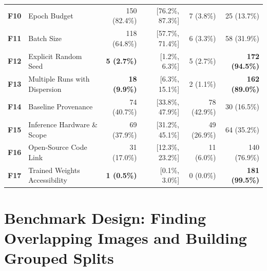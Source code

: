 \documentclass[pdflatex,sn-apa]{sn-jnl}
\begin{document}
\begin{table}[htbp]
\begin{tabularx}{\textwidth}{l >{\raggedright\arraybackslash}X r r r r}
\textbf{F10} & Epoch Budget & 150 (82.4\%) & [76.2\%, 87.3\%] & 7 (3.8\%) & 25 (13.7\%) \\
\textbf{F11} & Batch Size & 118 (64.8\%) & [57.7\%, 71.4\%] & 6 (3.3\%) & 58 (31.9\%) \\
\textbf{F12} & Explicit Random Seed & \textbf{5 (2.7\%)} & [1.2\%, 6.3\%] & 5 (2.7\%) & \textbf{172 (94.5\%)} \\
\textbf{F13} & Multiple Runs with Dispersion & \textbf{18 (9.9\%)} & [6.3\%, 15.1\%] & 2 (1.1\%) & \textbf{162 (89.0\%)} \\
\textbf{F14} & Baseline Provenance & 74 (40.7\%) & [33.8\%, 47.9\%] & 78 (42.9\%) & 30 (16.5\%) \\
\textbf{F15} & Inference Hardware \& Scope & 69 (37.9\%) & [31.2\%, 45.1\%] & 49 (26.9\%) & 64 (35.2\%) \\
\textbf{F16} & Open-Source Code Link & 31 (17.0\%) & [12.3\%, 23.2\%] & 11 (6.0\%) & 140 (76.9\%) \\
\textbf{F17} & Trained Weights Accessibility & \textbf{1 (0.5\%)} & [0.1\%, 3.0\%] & 0 (0.0\%) & \textbf{181 (99.5\%)} \\
\bottomrule
\end{tabularx}
\end{table}

\section{Benchmark Design: Finding Overlapping Images and Building Grouped Splits}\label{sec:bench_design}
\end{document}
